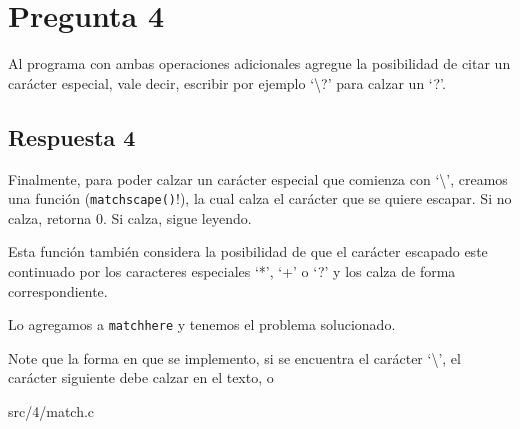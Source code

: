 \documentclass[spanish, fleqn]{article}
\begin{document}
\section{Pregunta 4}

Al programa con ambas operaciones adicionales agregue la posibilidad de citar un carácter especial, vale decir, escribir por ejemplo `\textbackslash ?' para calzar un `?'.

\subsection{Respuesta 4}

Finalmente, para poder calzar un carácter especial que comienza con `\textbackslash', creamos una función (\texttt{matchscape()}!), la cual calza el carácter que se quiere escapar. Si no calza, retorna 0. Si calza, sigue leyendo. 

Esta función también considera la posibilidad de que el carácter escapado este continuado por los caracteres especiales  `*', `+' o  `?' y los calza de forma correspondiente.

Lo agregamos a \texttt{matchhere} y tenemos el problema solucionado.

Note que la forma en que se implemento, si se encuentra el carácter `\textbackslash', el carácter siguiente debe calzar en el texto, o 

 {src/4/match.c}
\end{document}
